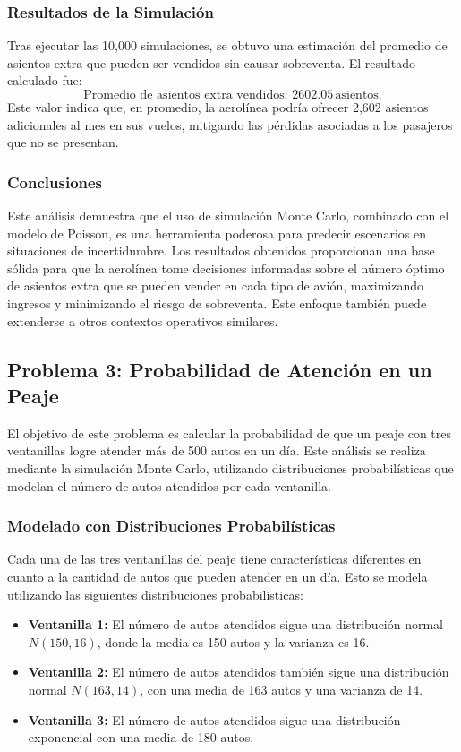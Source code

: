 \documentclass[12pt]{article}
\begin{document}
\subsubsection{Resultados de la Simulación}
Tras ejecutar las 10,000 simulaciones, se obtuvo una estimación del promedio de asientos extra que pueden ser vendidos sin causar sobreventa. El resultado calculado fue:
\[
\text{Promedio de asientos extra vendidos: } 2602.05 \, \text{asientos.}
\]
Este valor indica que, en promedio, la aerolínea podría ofrecer 2,602 asientos adicionales al mes en sus vuelos, mitigando las pérdidas asociadas a los pasajeros que no se presentan.

\subsubsection*{Conclusiones}
Este análisis demuestra que el uso de simulación Monte Carlo, combinado con el modelo de Poisson, es una herramienta poderosa para predecir escenarios en situaciones de incertidumbre. Los resultados obtenidos proporcionan una base sólida para que la aerolínea tome decisiones informadas sobre el número óptimo de asientos extra que se pueden vender en cada tipo de avión, maximizando ingresos y minimizando el riesgo de sobreventa. Este enfoque también puede extenderse a otros contextos operativos similares.


\subsection{Problema 3: Probabilidad de Atención en un Peaje}
El objetivo de este problema es calcular la probabilidad de que un peaje con tres ventanillas logre atender más de 500 autos en un día. Este análisis se realiza mediante la simulación Monte Carlo, utilizando distribuciones probabilísticas que modelan el número de autos atendidos por cada ventanilla.

\subsubsection{Modelado con Distribuciones Probabilísticas}
Cada una de las tres ventanillas del peaje tiene características diferentes en cuanto a la cantidad de autos que pueden atender en un día. Esto se modela utilizando las siguientes distribuciones probabilísticas:
\begin{itemize}
    \item \textbf{Ventanilla 1:} El número de autos atendidos sigue una distribución normal $N(150, 16)$, donde la media es 150 autos y la varianza es 16.
    \item \textbf{Ventanilla 2:} El número de autos atendidos también sigue una distribución normal $N(163, 14)$, con una media de 163 autos y una varianza de 14.
    \item \textbf{Ventanilla 3:} El número de autos atendidos sigue una distribución exponencial con una media de 180 autos.
\end{itemize}
\end{document}
